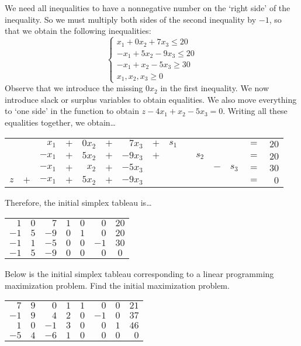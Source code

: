 \documentclass[11pt,letterpaper]{article}
\begin{document}
\sol We need all inequalities to have a nonnegative number on the `right side' of the inequality. So we must multiply both sides of the second inequality by $-1$, so that we obtain the following inequalities: 
	\[
	\begin{cases}
	x_1 + 0x_2 + 7x_3 \leq 20 \\
	-x_1 + 5x_2 - 9x_3 \leq 20 \\
	-x_1 + x_2 - 5x_3 \geq 30 \\
	x_1, x_2, x_3 \geq 0	
	\end{cases}
	\]
Observe that we introduce the missing $0x_2$ in the first inequality. We now introduce slack or surplus variables to obtain equalities. We also move everything to `one side' in the function to obtain $z - 4x_1 + x_2 - 5x_3= 0$. Writing all these equalities together, we obtain\dots \par
	\begin{table}[H]
	\centering
	\begin{tabular}{rrrrrrrrrrrrrrr}
	              & & $x_1$ & $+$ & $0x_2$ & $+$ & $7x_3$ & $+$ & $s_1$ & & & & & $=$ & $20$ \\
	              & & $-x_1$ & $+$ & $5x_2$ & $+$ & $-9x_3$ & $+$ & & & $s_2$ & & & $=$ & $20$ \\
	  	      & & $-x_1$ & $+$ & $x_2$ & $+$ & $-5x_3$ & & & & & $-$ &$s_3$ & $=$ & $30$ \\
	 $z$ & $+$ & $-x_1$ & $+$ & $5x_2$ & $+$ & $-9x_3$ & & & & & & & $=$ & $0$ \\
	\end{tabular}
	\end{table} \par
Therefore, the initial simplex tableau is\dots \par
	\begin{table}[H]
	\centering
	\begin{tabular}{rrrrrr|c}
	$1$ & $0$ & $7$ & $1$ & $0$& $0$ & $20$ \\ 
	$-1$ & $5$ & $-9$ & $0$ & $1$ & $0$ & $20$ \\
	$-1$ & $1$ & $-5$ & $0$ & $0$ & $-1$ & $30$ \\ \hline
	$-1$ & $5$ & $-9$ & $0$ & $0$& $0$ & $0$ 
	\end{tabular}
	\end{table}



\newpage



 Below is the initial simplex tableau corresponding to a linear programming maximization problem. Find the initial maximization problem. \par
	\begin{table}[H]
	\centering
	\begin{tabular}{rrrrrrrr}
	$7$ & $9$ & $0$ & $1$ & $1$ & $0$ & $0$ & $21$ \\
	$-1$ & $9$ & $4$ & $2$ & $0$ & $-1$ & $0$ & $37$ \\
	$1$ & $0$ & $-1$ & $3$ & $0$ & $0$ & $1$ & $46$ \\
	$-5$ & $4$ & $-6$ & $1$ & $0$ & $0$ & $0$ & $0$ \\
	\end{tabular}
	\end{table} \pspace
\end{document}
